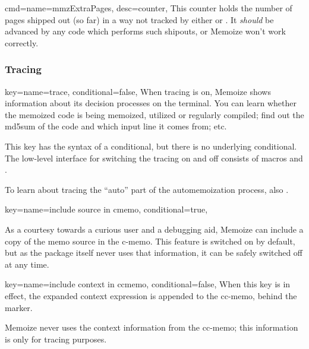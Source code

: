 \documentclass[a4paper,11pt]{article}
\begin{document}
\begin{doc}{
    cmd={name=mmzExtraPages, desc=counter},
  }
  This counter holds the number of pages shipped out (so far) in a way not
  tracked by either  or .  It
  \emph{should} be advanced by any code which performs such shipouts, or
  Memoize won't work correctly.
\end{doc}


\subsubsection{Tracing}
\label{sec:ref:memoization:tracing}

\begin{doc}{
    key={name=trace, conditional=false},
  }
  When tracing is on, Memoize shows information about its decision processes on
  the terminal.  You can learn whether the memoized code is being memoized,
  utilized or regularly compiled; find out the md5sum of the code and which
  input line it comes from; etc.

  This key has the syntax of a conditional, but there is no underlying
   conditional.  The low-level interface for switching the tracing
  on and off consists of macros  and
  .

  To learn about tracing the ``auto'' part of the automemoization process, also
  .
\end{doc}

\begin{doc}{
    key={name=include source in cmemo, conditional=true},
  }
    
  As a courtesy towards a curious user and a debugging aid, Memoize can include
  a copy of the memo source in the c-memo.  This feature is switched on by
  default, but as the package itself never uses that information, it can be
  safely switched off at any time.
\end{doc}

\begin{doc}{
    key={name=include context in ccmemo, conditional=false},
  }
  When this key is in effect, the expanded context expression is appended to
  the cc-memo, behind the  marker.

  Memoize never uses the context information from the cc-memo; this information
  is only for tracing purposes.
\end{doc}
\end{document}
